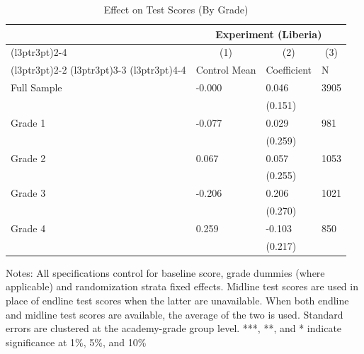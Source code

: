 \begin{table}[!h]
\centering
\caption{Effect on Test Scores (By Grade)}
\centering
\begin{threeparttable}
\begin{tabular}[t]{llll}
\toprule
\multicolumn{1}{c}{ } & \multicolumn{3}{c}{Experiment (Liberia)} \\
\cmidrule(l{3pt}r{3pt}){2-4}
\multicolumn{1}{c}{ } & \multicolumn{1}{c}{(1)} & \multicolumn{1}{c}{(2)} & \multicolumn{1}{c}{(3)} \\
\cmidrule(l{3pt}r{3pt}){2-2} \cmidrule(l{3pt}r{3pt}){3-3} \cmidrule(l{3pt}r{3pt}){4-4}
 & Control Mean & Coefficient & N\\
\midrule
Full Sample & -0.000 & 0.046 & 3905\\
 &  & (0.151) & \\
Grade 1 & -0.077 & 0.029 & 981\\
 &  & (0.259) & \\
Grade 2 & 0.067 & 0.057 & 1053\\
 &  & (0.255) & \\
Grade 3 & -0.206 & 0.206 & 1021\\
 &  & (0.270) & \\
Grade 4 & 0.259 & -0.103 & 850\\
 &  & (0.217) & \\
\bottomrule
\end{tabular}
\begin{tablenotes}[para]
\item Notes: All specifications control for baseline score, grade dummies (where applicable) and randomization strata fixed effects. Midline test scores are used in place of endline test scores when the latter are unavailable. When both endline and midline test scores are available, the average of the two is used. Standard errors are clustered at the academy-grade group level. ***, **, and * indicate significance at 1\%, 5\%, and 10\%
\end{tablenotes}
\end{threeparttable}
\end{table}
